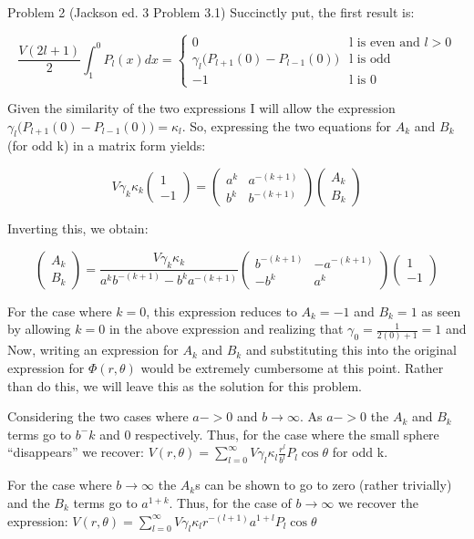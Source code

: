 \begin{homeworkProblem}{Problem 2 (Jackson ed. 3 Problem 3.1)}
Succinctly put, the first result is:

\[
\frac{V(2l+1)}{2} \int_{1}^{0} P_l(x) dx = \begin{cases} 0 & \text{l is even and $l > 0$} \\ \gamma_l \big(P_{l+1}(0) - P_{l-1}(0) \big) & \text{l is odd} \\ -1 & \text{l is 0} \end{cases}
\]

Given the similarity of the two expressions I will allow the expression $\gamma_l\big(P_{l+1}(0)-P_{l-1}(0)\big) = \kappa_l$. So, expressing the two equations for $A_{k}$ and $B_{k}$ (for odd k) in a matrix form yields:

\[
V\gamma_k \kappa_k
\begin{pmatrix}
1 \\ -1
\end{pmatrix}
=
\begin{pmatrix}
a^k & a^{-(k+1)} \\
b^k & b^{-(k+1)}
\end{pmatrix}
\begin{pmatrix}
	A_k \\ B_k
\end{pmatrix}
\]

Inverting this, we obtain:

\[
\begin{pmatrix}
	A_k \\ B_k
\end{pmatrix}
=
\frac{V\gamma_k \kappa_k}{a^k b^{-(k+1)} - b^k a^{-(k+1)}}
\begin{pmatrix}
b^{-(k+1)} & -a^{-(k+1)} \\
-b^k & a^k
\end{pmatrix}
\begin{pmatrix}
	1 \\ -1
\end{pmatrix}
\]

For the case where $k = 0$, this expression reduces to $A_k = -1$ and $B_k = 1$ as seen by allowing $k=0$ in the above expression and realizing that $\gamma_0 = \frac{1}{2(0)+1} = 1$ and 
Now, writing an expression for $A_k$ and $B_k$ and substituting this into the original expression for $\Phi(r,\theta)$ would be extremely cumbersome at this point. Rather than do this, we will leave this as the solution for this problem.

Considering the two cases where $a->0$ and $b \rightarrow \infty$. As $a->0$ the $A_k$ and $B_k$ terms go to $b^-k$ and 0 respectively. Thus, for the case where the small sphere ``disappears'' we recover: $V(r,\theta) = \sum\limits_{l=0}^\infty V\gamma_l \kappa_l\frac{r^l}{b^l}P_l\cos\theta$ for odd k.

For the case where $b \rightarrow \infty$ the $A_k$s can be shown to go to zero (rather trivially) and the $B_k$ terms go to $a^{1+k}$. Thus, for the case of $b \rightarrow \infty$ we recover the expression: $V(r,\theta) = \sum\limits_{l=0}^\infty V\gamma_l \kappa_l r^{-(l+1)} a^{1+l}P_l\cos\theta$

\end{homeworkProblem}